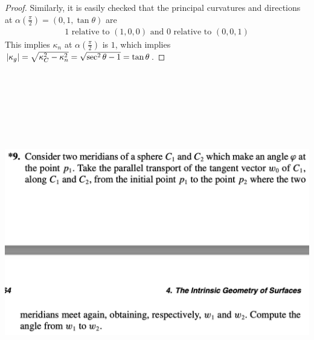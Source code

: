 \documentclass{report}
\begin{document}
\begin{proof}
Similarly, it is easily checked that the principal curvatures and directions at $\alpha (\frac{\pi}{2})=(0,1,\tan \theta)$ are
\begin{align*}
1\text{ relative to }(1,0,0)\text{ and }0\text{ relative to }(0,0,1)
\end{align*}
This implies $\kappa_n$ at $\alpha (\frac{\pi}{2})$ is $1$, which implies  $\left|\kappa_g\right|=\sqrt{\kappa_C^2 -\kappa_n^2}=\sqrt{\sec^2 \theta -1}=\tan \theta$.
\end{proof}
\begin{question}{}{}
\includegraphics[height=15cm,width=18cm]{hw73}
\end{question}
\end{document}
